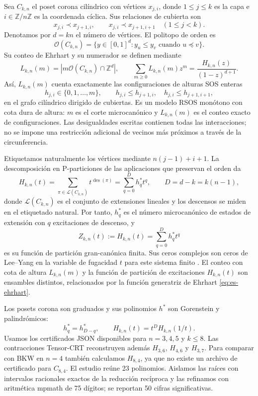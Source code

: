 \documentclass[11pt]{article}
\newcommand{\Z}{\mathbb{Z}}
\newcommand{\Ocal}{\mathcal{O}}
\begin{document}
Sea $C_{k,n}$ el poset corona cilíndrico con vértices $x_{j,i}$, donde $1\le j\le k$ es la capa e $i\in\Z/n\Z$ es la coordenada cíclica. Sus relaciones de cubierta son
\[
  x_{j,i}\prec x_{j+1,i},\qquad x_{j,i}\prec x_{j+1,i+1}
  \quad (1\le j<k).
\]
Denotamos por $d=kn$ el número de vértices. El politopo de orden es
\[
  \Ocal(C_{k,n})=\{y\in[0,1]^d:y_u\le y_v\text{ cuando }u\preceq v\}.
\]
Su conteo de Ehrhart y su numerador se definen mediante
\begin{equation}
  L_{k,n}(m)=|m\Ocal(C_{k,n})\cap\Z^d|,
  \qquad
  \sum_{m\ge0}L_{k,n}(m)z^m=\frac{H_{k,n}(z)}{(1-z)^{d+1}}.
  \label{eq:es-ehrhart}
\end{equation}
Así, $L_{k,n}(m)$ cuenta exactamente las configuraciones de alturas SOS enteras
\[
  h_{j,i}\in\{0,1,\ldots,m\},\qquad
  h_{j,i}\le h_{j+1,i},\quad h_{j,i}\le h_{j+1,i+1},
\]
en el grafo cilíndrico dirigido de cubiertas. Es un modelo RSOS monótono con cota dura de altura: $m$ es el corte microcanónico y $L_{k,n}(m)$ es el conteo exacto de configuraciones. Las desigualdades escritas contienen todas las interacciones; no se impone una restricción adicional de vecinos más próximos a través de la circunferencia.

Etiquetamos naturalmente los vértices mediante $n(j-1)+i+1$. La descomposición en P-particiones de las aplicaciones que preservan el orden da
\begin{equation}
  H_{k,n}(t)=\sum_{\pi\in\mathcal{L}(C_{k,n})}t^{\operatorname{des}(\pi)}
  =\sum_{q=0}^{D}h_q^*t^q,
  \qquad D=d-k=k(n-1),
  \label{eq:es-partition}
\end{equation}
donde $\mathcal{L}(C_{k,n})$ es el conjunto de extensiones lineales y los descensos se miden en el etiquetado natural. Por tanto, $h_q^*$ es el número microcanónico de estados de extensión con $q$ excitaciones de descenso, y
\[
  Z_{k,n}(t):=H_{k,n}(t)=\sum_{q=0}^{D}h_q^*t^q
\]
es su función de partición gran-canónica finita. Sus ceros complejos son ceros de Lee--Yang en la variable de fugacidad $t$ para este sistema finito \cite{LeeYang1952}. El conteo con cota de altura $L_{k,n}(m)$ y la función de partición de excitaciones $H_{k,n}(t)$ son ensambles distintos, relacionados por la función generatriz de Ehrhart \eqref{eq:es-ehrhart}.

Los posets corona son graduados y sus polinomios $h^*$ son Gorenstein y palindrómicos:
\begin{equation}
  h_q^*=h_{D-q}^*,\qquad H_{k,n}(t)=t^D H_{k,n}(1/t).
  \label{eq:es-reciprocal}
\end{equation}
Usamos los certificados JSON disponibles para $n=3,4,5$ y $k\le8$. Las contracciones Tensor-CRT reconstruyen además $H_{3,6}$, $H_{4,6}$ y $H_{3,7}$. Para comparar con BKW en $n=4$ también calculamos $H_{8,4}$, ya que no existe un archivo de certificado para $C_{8,4}$. El estudio reúne 23 polinomios. Aislamos las raíces con intervalos racionales exactos de la reducción recíproca y las refinamos con aritmética mpmath de 75 dígitos; se reportan 50 cifras significativas.
\end{document}

